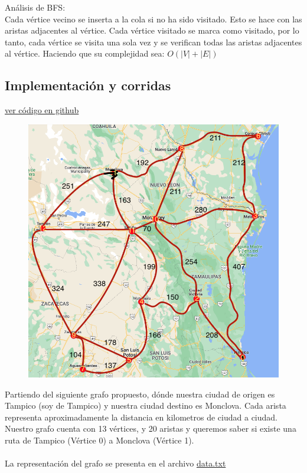 \documentclass{article}
\begin{document}
Análisis de BFS:\\

Cada vértice vecino se inserta a la cola si no ha sido visitado. Esto se hace con las aristas adjacentes al vértice. Cada vértice visitado se marca como visitado, por lo tanto, cada vértice se visita una sola vez y se verifican todas las aristas adjacentes al vértice. Haciendo que su complejidad sea: $O(|V|+|E|)$

\subsection{Implementación y corridas}

\href{https://github.com/luisballado/ADA/tree/main/practice_code/tarea5/car_highways}{ver código en github}\\

\begin{figure}[h]
  \includegraphics[scale=0.5]{grafo.png}
  \centering
\end{figure}

Partiendo del siguiente grafo propuesto, dónde nuestra ciudad de origen es Tampico (soy de Tampico) y nuestra ciudad destino es Monclova. Cada arista representa aproximadamente la distancia en kilometros de ciudad a ciudad.\\
Nuestro grafo cuenta con 13 vértices, y 20 aristas y queremos saber si existe una ruta de Tampico (Vértice 0) a Monclova (Vértice 1).\\\\
La representación del grafo se presenta en el archivo \href{https://github.com/luisballado/ADA/blob/main/practice_code/tarea5/car_highways/data.txt}{data.txt}\\
\end{document}

